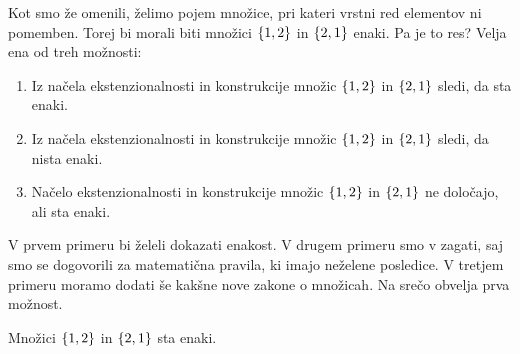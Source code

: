 Kot smo že omenili, želimo pojem množice, pri kateri vrstni red elementov ni pomemben.
Torej bi morali biti množici $\set{1, 2}$ in $\set{2, 1}$ enaki. Pa je to res? Velja ena
od treh možnosti:
%
\begin{enumerate}
\item Iz načela ekstenzionalnosti in konstrukcije množic $\set{1, 2}$ in $\set{2, 1}$ sledi, da sta enaki.
\item Iz načela ekstenzionalnosti in konstrukcije množic $\set{1, 2}$ in $\set{2, 1}$ sledi, da nista enaki.
\item Načelo ekstenzionalnosti in konstrukcije množic $\set{1, 2}$ in $\set{2, 1}$ ne določajo, ali sta enaki.
\end{enumerate}
%
V prvem primeru bi želeli dokazati enakost. V drugem primeru smo v zagati, saj smo se
dogovorili za matematična pravila, ki imajo neželene posledice. V tretjem primeru moramo
dodati še kakšne nove zakone o množicah. Na srečo obvelja prva možnost.

\begin{trditev}
  Množici $\set{1, 2}$ in $\set{2, 1}$ sta enaki.
\end{trditev}

